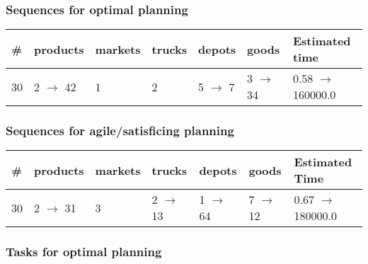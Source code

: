 \documentclass{article}
\begin{document}
                            \subsubsection*{Sequences for optimal planning}

                            \begin{center}
                            \begin{tabular}{@{}l|l|l|l|l|l|l@{}}
                            \# & products & markets & trucks & depots & goods & Estimated time\\\midrule
                            30&2 $\rightarrow$ 42&1&2&5 $\rightarrow$ 7&3 $\rightarrow$ 34&0.58 $\rightarrow$ 160000.0
                            \end{tabular}
                            \end{center}
                    
                         \subsubsection*{Sequences for agile/satisficing planning}

                        \begin{center}
                        \begin{tabular}{@{}l|l|l|l|l|l|l@{}}
                        \# & products & markets & trucks & depots & goods & Estimated Time\\\midrule
                        30&2 $\rightarrow$ 31&3&2 $\rightarrow$ 13&1 $\rightarrow$ 64&7 $\rightarrow$ 12&0.67 $\rightarrow$ 180000.0
                        \end{tabular}
                        \end{center}
                    
                                \subsubsection*{Tasks for optimal planning}
                                
\end{document}
